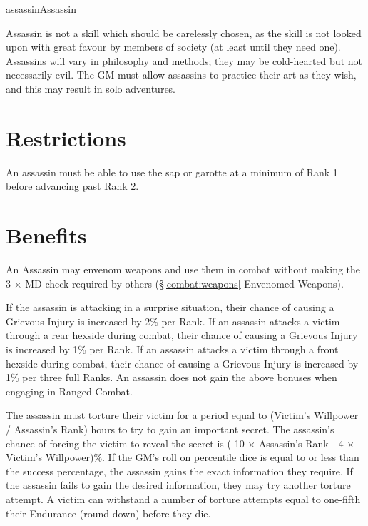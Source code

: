 \begin{Skill}{assassin}{Assassin}
  
Assassin is not a skill which should be carelessly chosen, as the
skill is not looked upon with great favour by members of society (at
least until they need one).  Assassins will vary in philosophy and
methods; they may be cold-hearted but not necessarily evil.  The GM
must allow assassins to practice their art as they wish, and this may
result in solo adventures.

\section{Restrictions}

An assassin must be able to use the sap or garotte at a minimum of
Rank 1 before advancing past Rank 2.

\section{Benefits}
\label{assassin:benefits}

An Assassin may envenom weapons and use them in combat without making
the 3 × MD check required by others (\S\ref{combat:weapons} Envenomed
Weapons).


If the assassin is attacking in a surprise situation, their chance of
causing a Grievous Injury is increased by 2\% per Rank.  If an
assassin attacks a victim through a rear hexside during combat, their
chance of causing a Grievous Injury is increased by 1\% per Rank.  If
an assassin attacks a victim through a front hexside during combat,
their chance of causing a Grievous Injury is increased by 1\% per
three full Ranks. An assassin does not gain the above bonuses when
engaging in Ranged Combat.



The assassin must torture their victim for a period equal to (Victim’s
Willpower / Assassin’s Rank) hours to try to gain an important
secret. The assassin’s chance of forcing the victim to reveal the
secret is ( 10 × Assassin’s Rank - 4 × Victim’s Willpower)\%.  If the
GM’s roll on percentile dice is equal to or less than the success
percentage, the assassin gains the exact information they require. If
the assassin fails to gain the desired information, they may try
another torture attempt. A victim can withstand a number of torture
attempts equal to one-fifth their Endurance (round down) before they
die.


\end{Skill}
